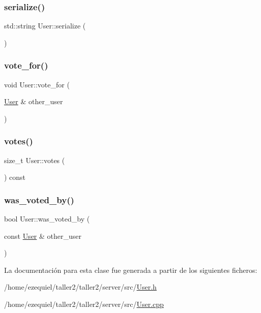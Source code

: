 \mbox{\label{classUser_a3394f9749a9e0c807ff34d148d9f835a}} 
\subsubsection{\texorpdfstring{serialize()}{serialize()}}
{\footnotesize\ttfamily std\+::string User\+::serialize (\begin{DoxyParamCaption}{ }\end{DoxyParamCaption})}

\mbox{\label{classUser_ae7bca2cb41eac8d576a781ac2de1b150}} 
\subsubsection{\texorpdfstring{vote\+\_\+for()}{vote\_for()}}
{\footnotesize\ttfamily void User\+::vote\+\_\+for (\begin{DoxyParamCaption}\item[{\hyperlink{classUser}{User} \&}]{other\+\_\+user }\end{DoxyParamCaption})}

\mbox{\label{classUser_a0b8e3871b4c9623b37dcfed43ddee1b3}} 
\subsubsection{\texorpdfstring{votes()}{votes()}}
{\footnotesize\ttfamily size\+\_\+t User\+::votes (\begin{DoxyParamCaption}{ }\end{DoxyParamCaption}) const}

\mbox{\label{classUser_a29b6fe2813703559ecb60f2f5614302f}} 
\subsubsection{\texorpdfstring{was\+\_\+voted\+\_\+by()}{was\_voted\_by()}}
{\footnotesize\ttfamily bool User\+::was\+\_\+voted\+\_\+by (\begin{DoxyParamCaption}\item[{const \hyperlink{classUser}{User} \&}]{other\+\_\+user }\end{DoxyParamCaption})}



La documentación para esta clase fue generada a partir de los siguientes ficheros\+:\begin{DoxyCompactItemize}
\item 
/home/ezequiel/taller2/taller2/server/src/\hyperlink{User_8h}{User.\+h}\item 
/home/ezequiel/taller2/taller2/server/src/\hyperlink{User_8cpp}{User.\+cpp}\end{DoxyCompactItemize}
